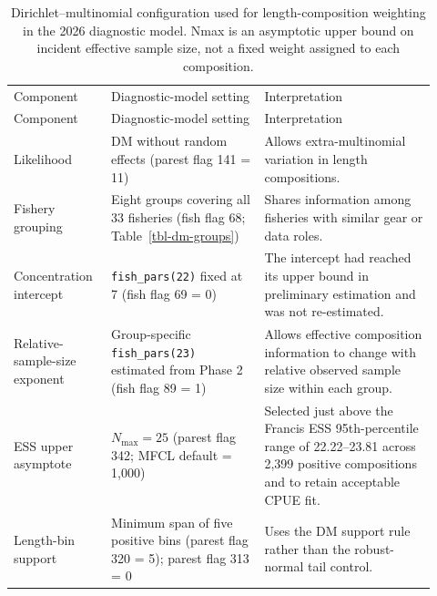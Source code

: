\documentclass[
  english,
  a4paper,
  a4paper,
  11pt]{SCreport}
\providecommand{\DIFaddbegin}{} %
\providecommand{\DIFdelend}{} %
\newcommand{\DIFaddincludegraphics}[2][]{{\color{blue}\fbox{\DIFOincludegraphics[#1]{#2}}}} %
\DeclareRobustCommand{\DIFaddbegin}{\DIFOaddbegin \let\includegraphics\DIFaddincludegraphics} %
\DeclareRobustCommand{\DIFdelend}{\DIFOaddend \let\includegraphics\DIFOincludegraphics} %
\begin{document}
\DIFdelend \DIFaddbegin \begin{longtable}{@{}>{\raggedright\arraybackslash}p{0.20\linewidth}>{\raggedright\arraybackslash}p{0.34\linewidth}>{\raggedright\arraybackslash}p{0.38\linewidth}@{}}

\caption{\label{tbl-dm-configuration}Dirichlet--multinomial configuration used for length-composition weighting in the 2026 diagnostic model. Nmax is an asymptotic upper bound on incident effective sample size, not a fixed weight assigned to each composition.}

\tabularnewline

\\
\toprule
Component & Diagnostic-model setting & Interpretation \\
\midrule
\endfirsthead
\toprule
Component & Diagnostic-model setting & Interpretation \\
\midrule
\endhead
\bottomrule
\endlastfoot
Likelihood & DM without random effects (parest flag 141 = 11) & Allows extra-multinomial variation in length compositions. \\
Fishery grouping & Eight groups covering all 33 fisheries (fish flag 68; Table~\ref{tbl-dm-groups}) & Shares information among fisheries with similar gear or data roles. \\
Concentration intercept & \texttt{fish\_pars(22)} fixed at 7 (fish flag 69 = 0) & The intercept had reached its upper bound in preliminary estimation and was not re-estimated. \\
Relative-sample-size exponent & Group-specific \texttt{fish\_pars(23)} estimated from Phase 2 (fish flag 89 = 1) & Allows effective composition information to change with relative observed sample size within each group. \\
ESS upper asymptote & $N_{\max}=25$ (parest flag 342; MFCL default = 1,000) & Selected just above the Francis ESS 95th-percentile range of 22.22--23.81 across 2,399 positive compositions and to retain acceptable CPUE fit. \\
Length-bin support & Minimum span of five positive bins (parest flag 320 = 5); parest flag 313 = 0 & Uses the DM support rule rather than the robust-normal tail control. \\

\end{longtable}

\endgroup

\vspace{0.8em}
\end{document}
